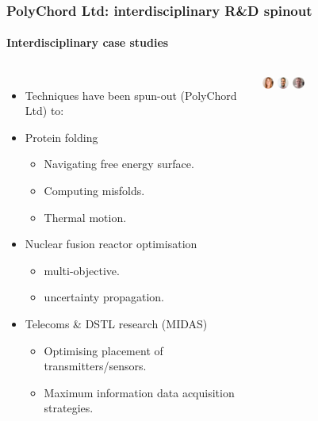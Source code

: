 \documentclass[aspectratio=169]{beamer}
\begin{document}
\begin{frame}
    \frametitle{PolyChord Ltd: interdisciplinary R\&D spinout}
    \framesubtitle{Interdisciplinary case studies}
    \begin{columns}
        \begin{itemize}
            \item Techniques have been spun-out (PolyChord Ltd) to:
            \item Protein folding
                \begin{itemize}
                    \item Navigating free energy surface.
                    \item Computing misfolds.
                    \item Thermal motion.
                \end{itemize}
            \item Nuclear fusion reactor optimisation
                \begin{itemize}
                    \item multi-objective.
                    \item uncertainty propagation.
                \end{itemize}
            \item Telecoms \& DSTL research (MIDAS)
                \begin{itemize}
                    \item Optimising placement of transmitters/sensors.
                    \item Maximum information data acquisition strategies.
                \end{itemize}
        \end{itemize}
        \includegraphics[width=0.08\textwidth]{figures/headshots/catherine-watkinson-polychord.jpg}%
        \includegraphics[width=0.08\textwidth]{figures/headshots/thomas-macaloone-polychord.jpg}%
        \includegraphics[width=0.08\textwidth]{figures/headshots/angus-peters-polychord.jpg}%

\end{columns}
\end{frame}
\end{document}
